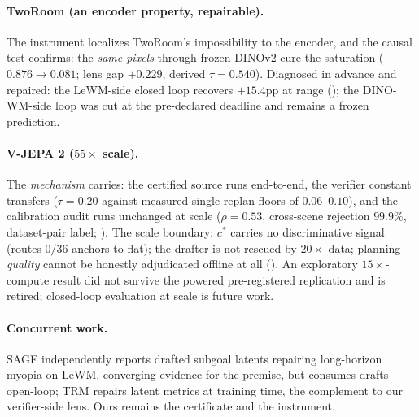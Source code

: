 \paragraph{TwoRoom (an encoder property, repairable).}\label{sec:generality-tworoom}
The instrument localizes TwoRoom's impossibility to the encoder, and the causal
test confirms: the \emph{same pixels} through frozen DINOv2 cure the saturation
($0.876 \to 0.081$; lens gap $+0.229$, derived $\tau{=}0.540$). Diagnosed in
advance and repaired: the LeWM-side closed loop recovers $+15.4$pp at range
(); the DINO-WM-side loop was cut at the
pre-declared deadline and remains a frozen prediction.

\paragraph{V-JEPA 2 ($55\times$ scale).}\label{sec:generality-scale}
The \emph{mechanism} carries: the certified source runs end-to-end, the
verifier constant transfers ($\tau{=}0.20$ against measured single-replan
floors of $0.06$--$0.10$), and the calibration audit runs unchanged at scale
($\rho=0.53$, cross-scene rejection $99.9\%$, dataset-pair label;
). The scale boundary: $c^{*}$ carries no
discriminative signal (routes $0/36$ anchors to flat); the drafter is not
rescued by $20\times$ data; planning \emph{quality} cannot be honestly
adjudicated offline at all (). An exploratory
$15\times$-compute result did not survive the powered pre-registered
replication and is retired; closed-loop evaluation at scale is future
work.

\paragraph{Concurrent work.} SAGE \citep{sage} independently reports drafted
subgoal latents repairing long-horizon myopia on LeWM, converging evidence
for the premise, but consumes drafts open-loop; TRM \citep{trm} repairs
latent metrics at training time, the complement to our verifier-side lens.
Ours remains the certificate and the instrument.
